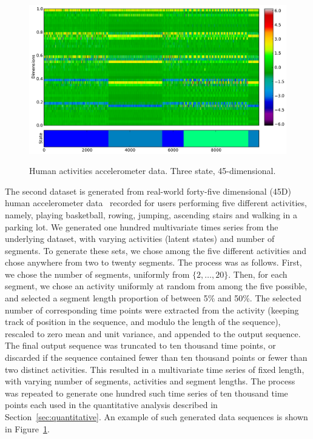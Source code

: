 \documentclass[12pt]{article}
\begin{document}
\begin{figure}[htbp]
  \caption{Human activities accelerometer data. Three state, 45-dimensional.}
  \centering
    \includegraphics[width=1.\linewidth]{images/accelerometer-data.pdf}
    \label{fig:accelerometer}
\end{figure}

The second dataset is generated from real-world forty-five dimensional (45D) human accelerometer data~\cite{Altun:2010:CSC:1823245.1823314} recorded for users performing five different activities, namely, playing basketball, rowing, jumping, ascending stairs and walking in a parking lot. We generated one hundred multivariate times series from the underlying dataset, with varying activities (latent states) and number of segments. To generate these sets, we chose among the five different activities and chose anywhere from two to twenty segments. The process was as follows. First, we chose the number of segments, uniformly from $\{2, \ldots, 20\}$. Then, for each segment, we chose an activity uniformly at random from among the five possible, and selected a segment length proportion of between 5\% and 50\%. The selected number of corresponding time points were extracted from the activity (keeping track of position in the sequence, and modulo the length of the sequence), rescaled to zero mean and unit variance, and appended to the output sequence. The final output sequence was truncated to ten thousand time points, or discarded if the sequence contained fewer than ten thousand points or fewer than two distinct activities. This resulted in a multivariate time series of fixed length, with varying number of segments, activities and segment lengths. The process was repeated to generate one hundred such time series of ten thousand time points each used in the quantitative analysis described in Section~\ref{sec:quantitative}. An example of such generated data sequences is shown in Figure~\ref{fig:accelerometer}.
\end{document}
